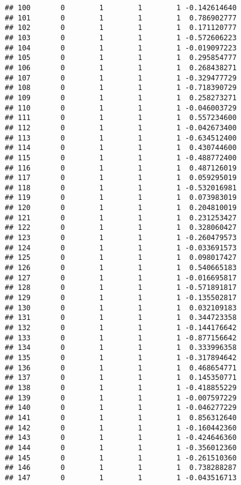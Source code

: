 \documentclass[]{book}
\theoremstyle{definition}
\theoremstyle{definition}
\theoremstyle{definition}
\theoremstyle{remark}
\begin{document}
\begin{verbatim}
## 100       0        1        1        1 -0.142614640
## 101       0        1        1        1  0.786902777
## 102       0        1        1        1  0.171120777
## 103       0        1        1        1 -0.572606223
## 104       0        1        1        1 -0.019097223
## 105       0        1        1        1  0.295854777
## 106       0        1        1        1  0.268438271
## 107       0        1        1        1 -0.329477729
## 108       0        1        1        1 -0.718390729
## 109       0        1        1        1  0.258273271
## 110       0        1        1        1 -0.046003729
## 111       0        1        1        1  0.557234600
## 112       0        1        1        1 -0.042673400
## 113       0        1        1        1 -0.634512400
## 114       0        1        1        1  0.430744600
## 115       0        1        1        1 -0.488772400
## 116       0        1        1        1  0.487126019
## 117       0        1        1        1  0.059295019
## 118       0        1        1        1 -0.532016981
## 119       0        1        1        1  0.073983019
## 120       0        1        1        1  0.204810019
## 121       0        1        1        1  0.231253427
## 122       0        1        1        1  0.328060427
## 123       0        1        1        1 -0.260479573
## 124       0        1        1        1 -0.033691573
## 125       0        1        1        1  0.098017427
## 126       0        1        1        1  0.540665183
## 127       0        1        1        1 -0.016695817
## 128       0        1        1        1 -0.571891817
## 129       0        1        1        1 -0.135502817
## 130       0        1        1        1  0.032109183
## 131       0        1        1        1  0.344723358
## 132       0        1        1        1 -0.144176642
## 133       0        1        1        1 -0.877156642
## 134       0        1        1        1  0.333996358
## 135       0        1        1        1 -0.317894642
## 136       0        1        1        1  0.468654771
## 137       0        1        1        1  0.145350771
## 138       0        1        1        1 -0.418855229
## 139       0        1        1        1 -0.007597229
## 140       0        1        1        1 -0.046277229
## 141       0        1        1        1  0.856312640
## 142       0        1        1        1 -0.160442360
## 143       0        1        1        1 -0.424646360
## 144       0        1        1        1 -0.356012360
## 145       0        1        1        1 -0.261510360
## 146       0        1        1        1  0.738288287
## 147       0        1        1        1 -0.043516713

\end{verbatim}
\end{document}
